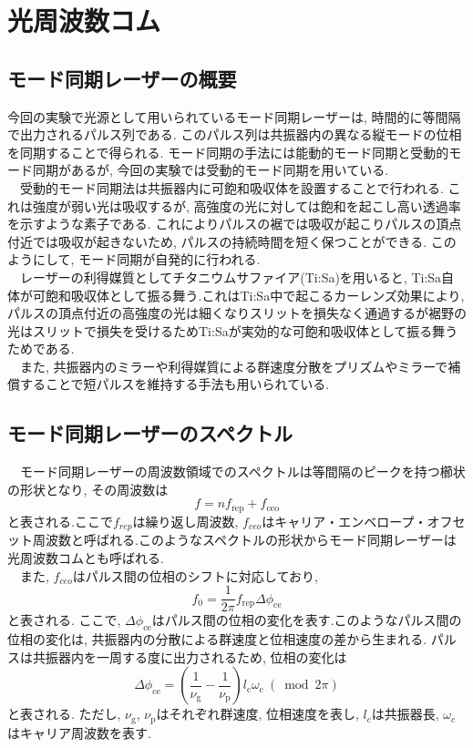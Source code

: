 \documentclass[uplatex, dvipdfmx, a4paper, report, papersize, 11pt]{jsbook}
\begin{document}
\section{光周波数コム}
\subsection{モード同期レーザーの概要}
今回の実験で光源として用いられているモード同期レーザーは, 時間的に等間隔で出力されるパルス列である. このパルス列は共振器内の異なる縦モードの位相を同期することで得られる. モード同期の手法には能動的モード同期と受動的モード同期があるが, 今回の実験では受動的モード同期を用いている.\\
　受動的モード同期法は共振器内に可飽和吸収体を設置することで行われる. これは強度が弱い光は吸収するが, 高強度の光に対しては飽和を起こし高い透過率を示すような素子である. これによりパルスの裾では吸収が起こりパルスの頂点付近では吸収が起きないため, パルスの持続時間を短く保つことができる. このようにして, モード同期が自発的に行われる.\\
　レーザーの利得媒質としてチタニウムサファイア(Ti:Sa)を用いると, Ti:Sa自体が可飽和吸収体として振る舞う.これはTi:Sa中で起こるカーレンズ効果により, パルスの頂点付近の高強度の光は細くなりスリットを損失なく通過するが裾野の光はスリットで損失を受けるためTi:Saが実効的な可飽和吸収体として振る舞うためである.\\
　また, 共振器内のミラーや利得媒質による群速度分散をプリズムやミラーで補償することで短パルスを維持する手法も用いられている.
\subsection{モード同期レーザーのスペクトル}
　モード同期レーザーの周波数領域でのスペクトルは等間隔のピークを持つ櫛状の形状となり, その周波数は
\begin{equation}
  f = nf_{\mathrm{rep}} + f_{\mathrm{ceo}}
\end{equation}
と表される\cite{Femtosecondopticalfrequencycombs}.ここで$f_{rep}$は繰り返し周波数, $f_{ceo}$はキャリア・エンベロープ・オフセット周波数と呼ばれる.このようなスペクトルの形状からモード同期レーザーは光周波数コムとも呼ばれる.\\
　また, $f_{ceo}$はパルス間の位相のシフトに対応しており,
 \begin{equation}
   f _ { 0 } = \frac { 1 } { 2 \pi } f _ { \mathrm { rep } } \Delta \phi _ { \mathrm { ce } }
 \end{equation}
と表される\cite{Femtosecondopticalfrequencycombs}. ここで, $\Delta \phi _ { \mathrm { ce } }$はパルス間の位相の変化を表す.このようなパルス間の位相の変化は, 共振器内の分散による群速度と位相速度の差から生まれる. パルスは共振器内を一周する度に出力されるため, 位相の変化は
\begin{equation}
  \Delta \phi _ { \mathrm { ce } } = \left( \frac { 1 } { \nu _ \mathrm{ g } } - \frac { 1 } { \nu _ \mathrm{ p } } \right) l _ \mathrm{ c } \omega _ \mathrm{ c }\ (\bmod 2 \pi)
\end{equation}
と表される\cite{Femtosecondopticalfrequencycombs}. ただし, $\nu _ \mathrm{ g }$, $\nu _ \mathrm{ p }$はそれぞれ群速度, 位相速度を表し, $l_c$は共振器長, $\omega_c$はキャリア周波数を表す.
\end{document}
